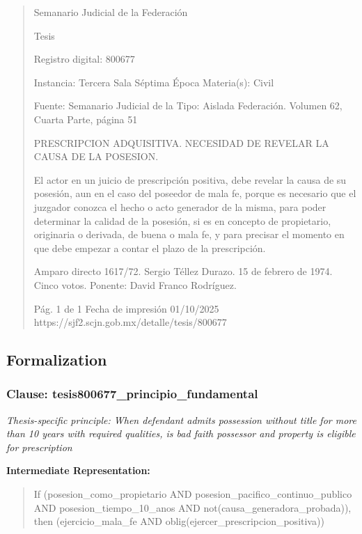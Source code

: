 \documentclass[11pt,a4paper]{article}
\begin{document}
\begin{quote}
                                                   Semanario Judicial de la Federación

                                                  Tesis

 Registro digital: 800677

 Instancia: Tercera Sala          Séptima Época                        Materia(s): Civil

                                  Fuente: Semanario Judicial de la     Tipo: Aislada
                                  Federación.
                                  Volumen 62, Cuarta Parte, página
                                  51


PRESCRIPCION ADQUISITIVA. NECESIDAD DE REVELAR LA CAUSA DE LA POSESION.


El actor en un juicio de prescripción positiva, debe revelar la causa de su posesión, aun en el caso
del poseedor de mala fe, porque es necesario que el juzgador conozca el hecho o acto generador
de la misma, para poder determinar la calidad de la posesión, si es en concepto de propietario,
originaria o derivada, de buena o mala fe, y para precisar el momento en que debe empezar a
contar el plazo de la prescripción.


Amparo directo 1617/72. Sergio Téllez Durazo. 15 de febrero de 1974. Cinco votos. Ponente: David
Franco Rodríguez.




                                             Pág. 1 de 1             Fecha de impresión 01/10/2025
  https://sjf2.scjn.gob.mx/detalle/tesis/800677

\end{quote}

\subsection{Formalization}

\subsubsection{Clause: tesis800677\_principio\_fundamental}

\textit{Thesis-specific principle: When defendant admits possession without title for more than 10 years with required qualities, is bad faith possessor and property is eligible for prescription}

\textbf{Intermediate Representation:}

\begin{quote}
If (posesion\_como\_propietario AND posesion\_pacifico\_continuo\_publico AND posesion\_tiempo\_10\_anos AND not(causa\_generadora\_probada)), then (ejercicio\_mala\_fe AND oblig(ejercer\_prescripcion\_positiva))
\end{quote}
\end{document}
